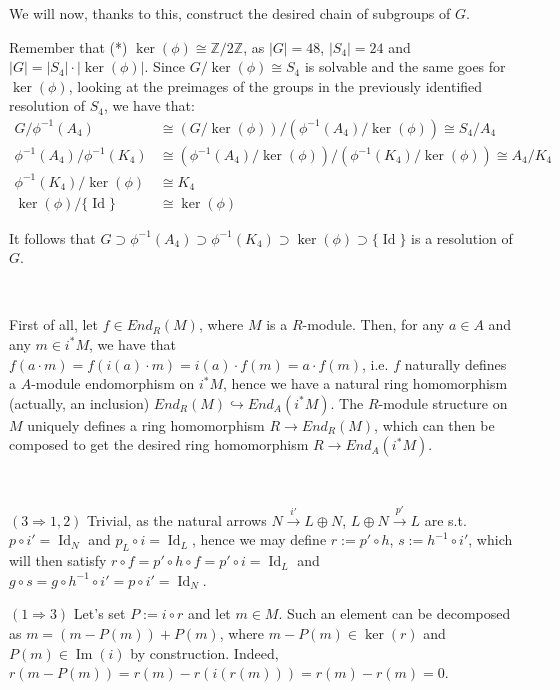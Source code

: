 \documentclass{article}
\newcommand{\numberset}{\mathbb}
\newcommand{\Z}{\numberset{Z}}
\newcommand{\exercise}[1]{\noindent {\bf Exercise #1}}
\DeclareMathOperator{\Ima}{Im}
\DeclareMathOperator{\Id}{Id}
\begin{document}
We will now, thanks to this, construct the desired chain of subgroups of
$G$.

Remember that (*) $\ker(\phi)\cong\Z/2\Z$, as $|G|=48$, $|S_4|=24$ and
$|G|=|S_4|\cdot |\ker(\phi)|$. Since $G/\ker(\phi)\cong S_4$ is solvable and the same
goes for $\ker(\phi)$, looking at the preimages of the groups in the previously
identified resolution of $S_4$, we have that:
\begin{align*}
    G/\phi^{-1}(A_4) &\cong(G/\ker(\phi))/(\phi^{-1}(A_4)/\ker(\phi))\cong S_4/A_4 \\
    \phi^{-1}(A_4)/\phi^{-1}(K_4) &\cong
    (\phi^{-1}(A_4)/\ker(\phi))/(\phi^{-1}(K_4)/\ker(\phi))\cong A_4/K_4 \\
    \phi^{-1}(K_4)/\ker(\phi) &\cong K_4 \\
    \ker(\phi)/\{\Id\} &\cong\ker(\phi)
\end{align*}

It follows that
$G\supset\phi^{-1}(A_4)\supset\phi^{-1}(K_4)\supset\ker(\phi)\supset
\{\Id\}$ is a resolution of $G$.



~\\
\exercise{1.13}

First of all, let $f\in End_R(M)$, where $M$ is a $R$-module.  Then, for any 
$a\in A$ and any $m\in i^*M$, we have that $f(a\cdot m)=f(i(a)\cdot m)=i(a)\cdot 
f(m)=a\cdot f(m)$, i.e. $f$ naturally defines a $A$-module endomorphism on 
$i^*M$, hence we have a natural ring homomorphism (actually, an inclusion) $End_R(M)
\hookrightarrow End_A(i^*M)$. The $R$-module structure on $M$ uniquely defines a 
ring homomorphism $R\rightarrow End_R(M)$, which can then be composed to get the 
desired ring homomorphism $R\rightarrow End_A(i^*M)$.


~\\
\exercise{2.4}

$(3\Rightarrow 1,2)$ Trivial, as the natural arrows $N\xrightarrow{i'} L\oplus N$, 
$L\oplus N\xrightarrow{p'} L$ are s.t. $p\circ i'=\Id_N$ and $p_L\circ i=\Id_L$,
hence we may define $r:=p'\circ h$, $s:=h^{-1}\circ i'$, which will then satisfy 
$r\circ f=p'\circ h\circ f=p'\circ i=\Id_L$ and $g\circ s=g\circ h^{-1}\circ i'=
p\circ i'=\Id_N$.

$(1\Rightarrow 3)$ Let's set $P:=i\circ r$ and let $m\in M$. Such an element can be 
decomposed as $m=(m-P(m))+P(m)$, where $m-P(m)\in\ker(r)$ and $P(m)\in\Ima(i)$ 
by construction. Indeed, $r(m-P(m))=r(m)-r(i(r(m)))=r(m)-r(m)=0$.
\end{document}
